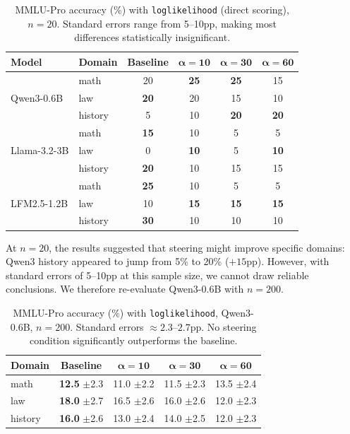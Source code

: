 \documentclass[11pt,a4paper]{article}
\begin{document}
\begin{table}[H]
\centering
\caption{MMLU-Pro accuracy (\%) with \texttt{loglikelihood} (direct scoring), $n=20$. Standard errors range from 5--10pp, making most differences statistically insignificant.}
\label{tab:mmlu_mc}
\small
\begin{tabular}{ll cccc}
\toprule
\textbf{Model} & \textbf{Domain} & \textbf{Baseline} & $\boldsymbol{\alpha=10}$ & $\boldsymbol{\alpha=30}$ & $\boldsymbol{\alpha=60}$ \\
\midrule
\multirow{3}{*}{Qwen3-0.6B} & math & 20 & \textbf{25} & \textbf{25} & 15 \\
& law & \textbf{20} & 20 & 15 & 10 \\
& history & 5 & 10 & \textbf{20} & \textbf{20} \\
\midrule
\multirow{3}{*}{Llama-3.2-3B} & math & \textbf{15} & 10 & 5 & 5 \\
& law & 0 & \textbf{10} & 5 & \textbf{10} \\
& history & \textbf{20} & 10 & 15 & 15 \\
\midrule
\multirow{3}{*}{LFM2.5-1.2B} & math & \textbf{25} & 10 & 5 & 5 \\
& law & 10 & \textbf{15} & \textbf{15} & \textbf{15} \\
& history & \textbf{30} & 10 & 10 & 10 \\
\bottomrule
\end{tabular}
\end{table}

At $n=20$, the results suggested that steering might improve specific domains: Qwen3 history appeared to jump from 5\% to 20\% ($+15$pp). However, with standard errors of 5--10pp at this sample size, we cannot draw reliable conclusions. We therefore re-evaluate Qwen3-0.6B with $n=200$.

\begin{table}[H]
\centering
\caption{MMLU-Pro accuracy (\%) with \texttt{loglikelihood}, Qwen3-0.6B, $n=200$. Standard errors $\approx 2.3$--$2.7$pp. No steering condition significantly outperforms the baseline.}
\label{tab:mmlu_mc_n200}
\small
\begin{tabular}{l cccc}
\toprule
\textbf{Domain} & \textbf{Baseline} & $\boldsymbol{\alpha=10}$ & $\boldsymbol{\alpha=30}$ & $\boldsymbol{\alpha=60}$ \\
\midrule
math & \textbf{12.5} {\scriptsize $\pm$2.3} & 11.0 {\scriptsize $\pm$2.2} & 11.5 {\scriptsize $\pm$2.3} & 13.5 {\scriptsize $\pm$2.4} \\
law & \textbf{18.0} {\scriptsize $\pm$2.7} & 16.5 {\scriptsize $\pm$2.6} & 16.0 {\scriptsize $\pm$2.6} & 12.0 {\scriptsize $\pm$2.3} \\
history & \textbf{16.0} {\scriptsize $\pm$2.6} & 13.0 {\scriptsize $\pm$2.4} & 14.0 {\scriptsize $\pm$2.5} & 12.0 {\scriptsize $\pm$2.3} \\
\bottomrule
\end{tabular}
\end{table}
\end{document}
